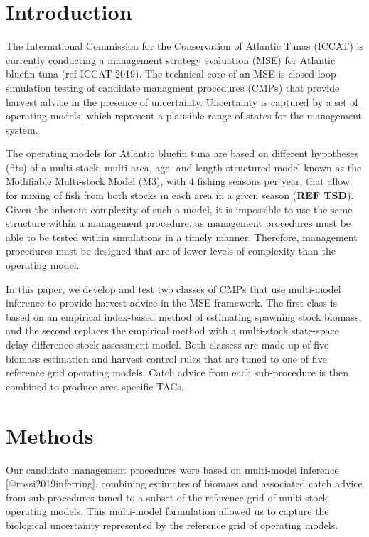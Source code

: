 \documentclass[]{article}
\begin{document}
{
\hypersetup{linkcolor=black}
\setcounter{tocdepth}{2}
\tableofcontents
}
\hypertarget{introduction}{%
\section{Introduction}\label{introduction}}

The International Commission for the Conservation of Atlantic
Tunas (ICCAT) is currently conducting a management strategy evaluation (MSE)
for Atlantic bluefin tuna (ref ICCAT 2019). The technical core
of an MSE is closed loop simulation testing of candidate managment
procedures (CMPs) that provide harvest advice in the presence
of uncertainty. Uncertainty is captured by a set of operating models,
which represent a plausible range of states for the
management system.

The operating models for Atlantic bluefin tuna are based on different
hypotheses (fits) of a multi-stock, multi-area, age- and length-structured
model known as the Modifiable Multi-stock Model (M3), with 4 fishing
seasons per year, that allow for mixing of fish from both stocks in each area in a given
season (\textbf{REF TSD}). Given the inherent complexity of such
a model, it is impossible to use the same structure within a management
procedure, as management procedures must be able to be tested within
simulations in a timely manner. Therefore, management procedures must
be designed that are of lower levels of complexity than the operating model.

In this paper, we develop and test two classes of CMPs that use multi-model inference
to provide harvest advice in the MSE framework. The first class is
based on an empirical index-based method of estimating spawning stock
biomass, and the second replaces the empirical method with a multi-stock
state-space delay difference stock assessment model. Both classess are
made up of five biomass estimation and harvest control rules that are
tuned to one of five reference grid operating models. Catch advice from each
sub-procedure is then combined to produce area-specific TACs.

\hypertarget{methods}{%
\section{Methods}\label{methods}}

Our candidate management procedures were based on multi-model inference
{[}@rossi2019inferring{]}, combining estimates of biomass and associated catch
advice from sub-procedures tuned to a subset of the reference grid of
multi-stock operating models. This multi-model formulation allowed us to
capture the biological uncertainty represented by the reference grid
of operating models.
\end{document}
